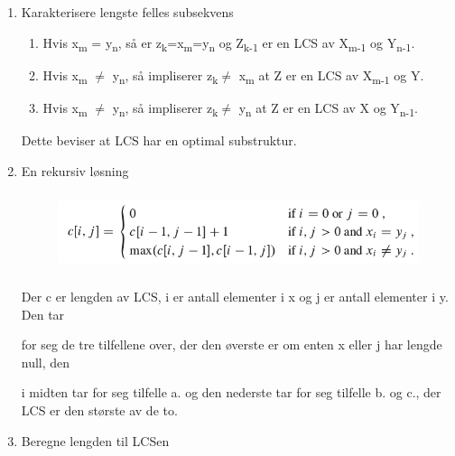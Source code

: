 \documentclass[12pt]{report}
\begin{document}
\begin{enumerate}
	\item Karakterisere lengste felles subsekvens\par

\begin{enumerate}
	\item Hvis x\textsubscript{m} = y\textsubscript{n}, så er z\textsubscript{k}=x\textsubscript{m}=y\textsubscript{n} og Z\textsubscript{k-1} er en LCS av X\textsubscript{m-1} og Y\textsubscript{n-1}.\par

	\item Hvis x\textsubscript{m} $ \neq $  y\textsubscript{n}, så impliserer z\textsubscript{k}$ \neq $ x\textsubscript{m} at Z er en LCS av X\textsubscript{m-1} og Y.\par

	\item Hvis x\textsubscript{m} $ \neq $  y\textsubscript{n}, så impliserer z\textsubscript{k}$ \neq $ y\textsubscript{n} at Z er en LCS av X og Y\textsubscript{n-1}.
\end{enumerate}\par

\tab Dette beviser at LCS har en optimal substruktur. \par

	\item En rekursiv løsning\par




\begin{figure}[H]
	\begin{Center}
		\includegraphics[width=5.22in,height=0.91in]{./media/image55.png}
	\end{Center}
\end{figure}



\tab \par

\tab Der c er lengden av LCS, i er antall elementer i x og j er antall elementer i y. Den tar \par

for seg de tre tilfellene over, der den øverste er om enten x eller j har lengde null, den \par

i midten tar for seg tilfelle a. og den nederste tar for seg tilfelle b. og c., der LCS er den største av de to. \par

	\item Beregne lengden til LCSen
\end{enumerate}\par
\end{document}
